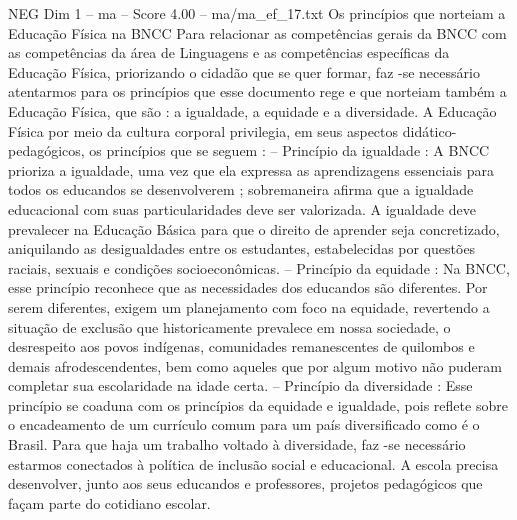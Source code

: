\begin{textsample}{NEG Dim 1 – ma – Score 4.00 – ma/ma\_ef\_17.txt}  \label{ex:f1_neg_223}
Os princípios que norteiam a Educação Física na BNCC Para relacionar as competências gerais da BNCC com as competências da área de Linguagens e as competências específicas da Educação Física, priorizando o cidadão que se quer formar, faz -se necessário atentarmos para os princípios que esse documento rege e que norteiam também a Educação Física, que são : a igualdade, a equidade e a diversidade.
A Educação Física por meio da cultura corporal privilegia, em seus aspectos didático-pedagógicos, os princípios que se seguem : – Princípio da igualdade : A BNCC prioriza a igualdade, uma vez que ela expressa as aprendizagens essenciais para todos os educandos se desenvolverem ; sobremaneira afirma que a igualdade educacional com suas particularidades deve ser valorizada.
A igualdade deve prevalecer na Educação Básica para que o direito de aprender seja concretizado, aniquilando as desigualdades entre os estudantes, estabelecidas por questões raciais, sexuais e condições socioeconômicas. – Princípio da equidade : Na BNCC, esse princípio reconhece que as necessidades dos educandos são diferentes.
Por serem diferentes, exigem um planejamento com foco na equidade, revertendo a situação de exclusão que historicamente prevalece em nossa sociedade, o desrespeito aos povos indígenas, comunidades remanescentes de quilombos e demais afrodescendentes, bem como aqueles que por algum motivo não puderam completar sua escolaridade na idade certa. – Princípio da diversidade : Esse princípio se coaduna com os princípios da equidade e igualdade, pois reflete sobre o encadeamento de um currículo comum para um país diversificado como é o Brasil.
Para que haja um trabalho voltado à diversidade, faz -se necessário estarmos conectados à política de inclusão social e educacional.
A escola precisa desenvolver, junto aos seus educandos e professores, projetos pedagógicos que façam parte do cotidiano escolar.

\end{textsample}
